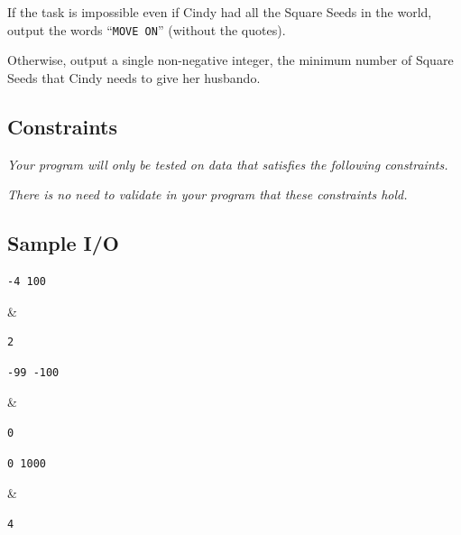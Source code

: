 If the task is impossible even if Cindy had all the Square Seeds in the world, output the words ``\texttt{MOVE ON}'' (without the quotes).

Otherwise, output a single non-negative integer, the minimum number of Square Seeds that Cindy needs to give her husbando.

\subsection*{Constraints}

\textit{Your program will only be tested on data that satisfies the following constraints.}


\textit{There is no need to validate in your program that these constraints hold.}

\subsection*{Sample I/O}

\begin{sampleIO}
\begin{verbatim}
-4 100
\end{verbatim}
&
\begin{verbatim}
2
\end{verbatim}
\end{sampleIO}

\begin{sampleIO}
\begin{verbatim}
-99 -100
\end{verbatim}
&
\begin{verbatim}
0
\end{verbatim}
\end{sampleIO}

\begin{sampleIO}
\begin{verbatim}
0 1000
\end{verbatim}
&
\begin{verbatim}
4
\end{verbatim}
\end{sampleIO}




